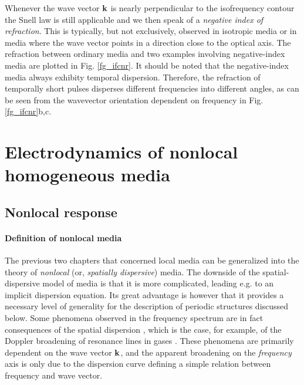 Whenever the wave vector ${\mathbf{k}}$ is nearly perpendicular to the isofrequency contour the Snell law is still applicable and we then speak of a \textit{negative index of refraction}. 
This is typically, but not exclusively, observed in isotropic media or in media where the wave vector points in a direction close to the optical axis.
The refraction between ordinary media and two examples involving negative-index media are plotted in Fig. \ref{fg_ifcnr}. It should be noted that the negative-index media always exhibity temporal dispersion. Therefore, the refraction of temporally short pulses disperses different frequencies into different angles, as can be seen from the wavevector orientation dependent on frequency in Fig. \ref{fg_ifcnr}b,c.

\section{Electrodynamics of nonlocal homogeneous media} %
\label{chap_nonloc}
\subsection{Nonlocal response} 
\paragraph{Definition of nonlocal media}%
The previous two chapters that concerned local media can be generalized into the theory of \textit{nonlocal} (or, \textit{spatially dispersive}) media.  The downside of the spatial-dispersive model of media is that it is more complicated, leading e.g. to an implicit dispersion equation. Its great advantage is however that it provides a necessary level of generality for the description of periodic structures discussed below. 
Some phenomena observed in the frequency spectrum are in fact consequences of the spatial dispersion \cite[p. 359]{landau1984electrodynamics}, which is the case, for example, of the Doppler broadening of resonance lines in gases \cite{makarov2004permittivity}. 
These phenomena are primarily dependent on the wave vector ${\mathbf{k}}$, and the apparent broadening on the \textit{frequency} axis is only due to the dispersion curve defining a simple relation between  frequency and wave vector.  

